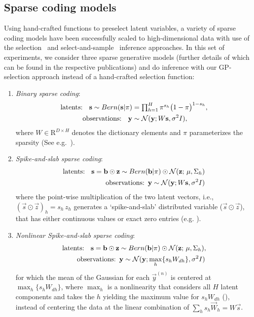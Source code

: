 \subsection{Sparse coding models}
Using hand-crafted functions to preselect latent variables, a variety of sparse coding models have been successfully scaled to high-dimensional  data with use of the selection~\citep{HennigesEtAl2010, BornscheinEtAl2013, SheikhEtAl2014} and select-and-sample~\citep{SheltonEtAl2011, SheltonEtAl2012} inference approaches.
In this set of experiments, we consider three sparse generative models (further details of which can be found in the respective publications) and do inference with our GP-selection approach instead of a hand-crafted selection function:
%
\begin{enumerate}
\item \textit{Binary sparse coding}:
%
\vspace{-.1cm}
\begin{align}
\text{latents: } \,\,\,\vec{s} \sim Bern(\vec{s} | \pi) &= \disT\prod_{h=1}^H \pi^{s_h} \big( 1 - \pi \big)^{1-s_h},\nonumber \\
\text{observations:  }\,\,\,    \vec{y} &\sim \mathcal{N}(\vec{y}; W\vec{s}, \sigma^2\One),\nonumber%
\end{align}
%
where $W \in \mathrm{R}^{D \times H}$ denotes the dictionary elements and $\pi$ parameterizes the sparsity (See e.g.~\citep{HennigesEtAl2010}).
%
\item \textit{Spike-and-slab sparse coding}:
\vspace{-.2cm}
\begin{align}
\text{latents: } \,\,\,\vec{s} = \vec{b}\odot\vec{z} \sim Bern(\vec{b} | \pi) \odot \mathcal{N}(\vec{z};\,\vec{\mu} , \Sigma_h)\nonumber\\
\text{observations:}  \,\,\, \vec{y} \sim \mathcal{N}(\vec{y}; W\vec{s}, \sigma^2\One)\nonumber%
\end{align}
where the point-wise multiplication of the two latent vectors, i.e., $(\vec{s}\odot\vec{z})_h = s_h\,z_h$
generates a `spike-and-slab' distributed variable ($\vec{s}\odot\vec{z}$), that has either continuous values or exact zero entries (e.g. \citep{TitsiasGredilla2011,GoodfellowEtAl2013,SheikhEtAl2014}).
%
\item \textit{Nonlinear Spike-and-slab sparse coding}:
\vspace{-.2cm}
\begin{align}\label{eq:ssmca}
\text{latents: } \,\,\,{\mathbf{s}} = {\mathbf{b}}\odot{\mathbf{z}} &\sim Bern({\mathbf{b}} | \pi) \odot \mathcal{N}({\mathbf{z}};\,{\mathbf{\mu}} , \Sigma_h), \nonumber\\
 \text{observations:}\,\,\, &{\mathbf{y}} \sim \mathcal{N}({\mathbf{y}}; \max_{h}\{s_hW_{dh}\}, \sigma^2I)\nonumber
\end{align}
for which the mean of the Gaussian for each $\vec{y}^{(n)}$ is centered at $\max_{h}\{s_hW_{dh}\}$, where $\max_{h}$ is a nonlinearity that considers all $H$ latent components and takes the $h$ yielding the maximum value for $s_hW_{dh}$ (\citep{LuckeSahani2008,SheltonEtAl2012,BornscheinEtAl2013}), instead of centering the data at the linear combination of $\sum_h s_h\vec{W}_h=W\vec{s}$.
%
\end{enumerate}

